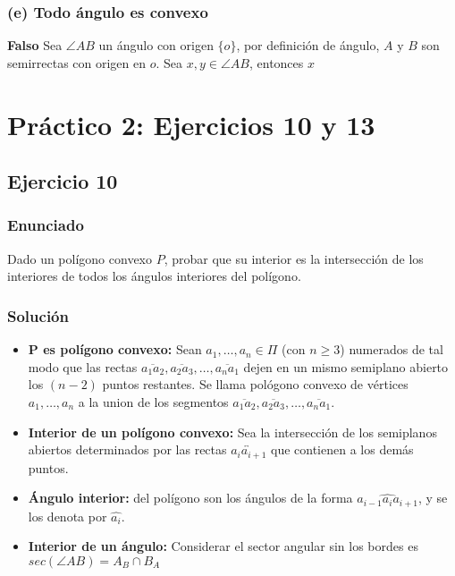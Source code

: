 \documentclass[a4paper]{article}
\begin{document}
\subsubsection{(e) Todo ángulo es convexo}
\textbf{Falso} Sea $\angle AB$ un ángulo con origen $\{o\}$, por definición de ángulo, $A$ y $B$ son semirrectas con origen en $o$. Sea $x,y \in \angle AB$, entonces $x$

\section{Práctico 2: Ejercicios 10 y 13}
\subsection{Ejercicio 10}
\subsubsection{Enunciado}
Dado un polígono convexo $P$, probar que su interior es la intersección de los interiores de todos los ángulos interiores del polígono.
\subsubsection{Solución}
\begin{itemize}
\item \textbf{P es polígono convexo:} Sean $a_1,\dots, a_n \in \Pi$ (con $n\geq 3$) numerados de tal modo que las rectas $\overline{a_1a_2}, \overline{a_2a_3}, \dots, \overline{a_na_1}$ dejen en un mismo semiplano abierto los $(n-2)$ puntos restantes. Se llama pológono convexo de vértices $a_1,\dots,a_n$ a la union de los segmentos $\overline{a_1a_2}, \overline{a_2a_3}, \dots, \overline{a_na_1}$.
\item \textbf{Interior de un polígono convexo:} Sea la intersección de los semiplanos abiertos determinados por las rectas $\overleftrightarrow{a_ia_{i+1}}$ que contienen a los demás puntos.
\item \textbf{Ángulo interior:} del polígono son los ángulos de la forma $\widehat{a_{i-1}a_ia_{i+1}}$, y se los denota por $\hat{a_i}$.
\item \textbf{Interior de un ángulo:} Considerar el sector angular sin los bordes es $sec(\angle AB)=A_B\cap B_A$
\end{itemize}
\end{document}
